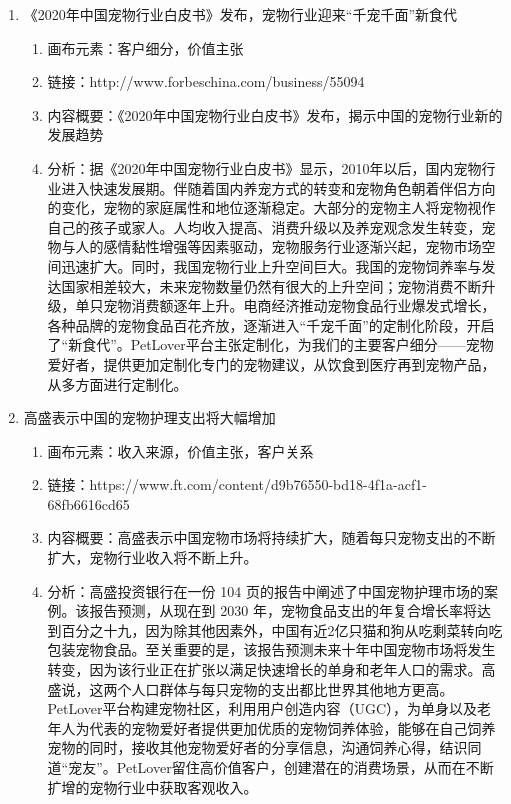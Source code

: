 \documentclass[a4paper]{ctexart}
\begin{document}
\begin{enumerate}[label=\alph*.]
\begin{enumerate}[label=\alph*.]
  \end{enumerate}
  \item 《2020年中国宠物行业白皮书》发布，宠物行业迎来“千宠千面”新食代
  \begin{enumerate}[label=\alph*.]
    \item 画布元素：客户细分，价值主张
    \item 链接：http://www.forbeschina.com/business/55094
    \item 内容概要：《2020年中国宠物行业白皮书》发布，揭示中国的宠物行业新的发展趋势
    \item 分析：据《2020年中国宠物行业白皮书》显示，2010年以后，国内宠物行业进入快速发展期。伴随着国内养宠方式的转变和宠物角色朝着伴侣方向的变化，宠物的家庭属性和地位逐渐稳定。大部分的宠物主人将宠物视作自己的孩子或家人。人均收入提高、消费升级以及养宠观念发生转变，宠物与人的感情黏性增强等因素驱动，宠物服务行业逐渐兴起，宠物市场空间迅速扩大。同时，我国宠物行业上升空间巨大。我国的宠物饲养率与发达国家相差较大，未来宠物数量仍然有很大的上升空间；宠物消费不断升级，单只宠物消费额逐年上升。电商经济推动宠物食品行业爆发式增长，各种品牌的宠物食品百花齐放，逐渐进入“千宠千面”的定制化阶段，开启了“新食代”。PetLover平台主张定制化，为我们的主要客户细分——宠物爱好者，提供更加定制化专门的宠物建议，从饮食到医疗再到宠物产品，从多方面进行定制化。
  \end{enumerate}
  \item 高盛表示中国的宠物护理支出将大幅增加
  \begin{enumerate}[label=\alph*.]
    \item 画布元素：收入来源，价值主张，客户关系
    \item 链接：https://www.ft.com/content/d9b76550-bd18-4f1a-acf1-68fb6616cd65
    \item 内容概要：高盛表示中国宠物市场将持续扩大，随着每只宠物支出的不断扩大，宠物行业收入将不断上升。
    \item 分析：高盛投资银行在一份 104 页的报告中阐述了中国宠物护理市场的案例。该报告预测，从现在到 2030 年，宠物食品支出的年复合增长率将达到百分之十九，因为除其他因素外，中国有近2亿只猫和狗从吃剩菜转向吃包装宠物食品。至关重要的是，该报告预测未来十年中国宠物市场将发生转变，因为该行业正在扩张以满足快速增长的单身和老年人口的需求。高盛说，这两个人口群体与每只宠物的支出都比世界其他地方更高。PetLover平台构建宠物社区，利用用户创造内容（UGC），为单身以及老年人为代表的宠物爱好者提供更加优质的宠物饲养体验，能够在自己饲养宠物的同时，接收其他宠物爱好者的分享信息，沟通饲养心得，结识同道“宠友”。PetLover留住高价值客户，创建潜在的消费场景，从而在不断扩增的宠物行业中获取客观收入。

\end{enumerate}
\end{enumerate}
\end{document}
